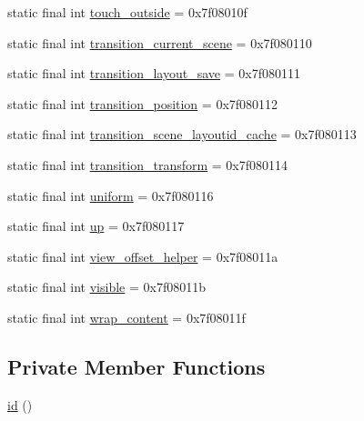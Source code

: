 \begin{DoxyCompactItemize}
\item 
static final int \mbox{\hyperlink{classandroid_1_1support_1_1design_1_1_r_1_1id_ab8211b0d7277775cf8c214969d03915e}{touch\+\_\+outside}} = 0x7f08010f
\item 
static final int \mbox{\hyperlink{classandroid_1_1support_1_1design_1_1_r_1_1id_a75728c7ae11fb924149bcd39c4f7f843}{transition\+\_\+current\+\_\+scene}} = 0x7f080110
\item 
static final int \mbox{\hyperlink{classandroid_1_1support_1_1design_1_1_r_1_1id_ae07562594f75d7b832f160869fe9432f}{transition\+\_\+layout\+\_\+save}} = 0x7f080111
\item 
static final int \mbox{\hyperlink{classandroid_1_1support_1_1design_1_1_r_1_1id_af03e341e1ccf6730fff343b035efc176}{transition\+\_\+position}} = 0x7f080112
\item 
static final int \mbox{\hyperlink{classandroid_1_1support_1_1design_1_1_r_1_1id_adf45e834c51610a398a2fc8655464d2a}{transition\+\_\+scene\+\_\+layoutid\+\_\+cache}} = 0x7f080113
\item 
static final int \mbox{\hyperlink{classandroid_1_1support_1_1design_1_1_r_1_1id_ade83b753c44146d78866b5f544249143}{transition\+\_\+transform}} = 0x7f080114
\item 
static final int \mbox{\hyperlink{classandroid_1_1support_1_1design_1_1_r_1_1id_afd2d95e460620b888ef95af5d6a2f47b}{uniform}} = 0x7f080116
\item 
static final int \mbox{\hyperlink{classandroid_1_1support_1_1design_1_1_r_1_1id_a1a22501200657ffeeaa195ac9fd5db8e}{up}} = 0x7f080117
\item 
static final int \mbox{\hyperlink{classandroid_1_1support_1_1design_1_1_r_1_1id_a444601de1ff3abd16c891e62ecd7692a}{view\+\_\+offset\+\_\+helper}} = 0x7f08011a
\item 
static final int \mbox{\hyperlink{classandroid_1_1support_1_1design_1_1_r_1_1id_a8ae9495679191ce8aa5c91e0c5d11460}{visible}} = 0x7f08011b
\item 
static final int \mbox{\hyperlink{classandroid_1_1support_1_1design_1_1_r_1_1id_a6e8a85590f5382de4d0dfabf2d8919be}{wrap\+\_\+content}} = 0x7f08011f
\end{DoxyCompactItemize}
\subsection*{Private Member Functions}
\begin{DoxyCompactItemize}
\item 
\mbox{\hyperlink{classandroid_1_1support_1_1design_1_1_r_1_1id_a50ff9c45db6e42295d0d7771e50055f7}{id}} ()
\end{DoxyCompactItemize}


